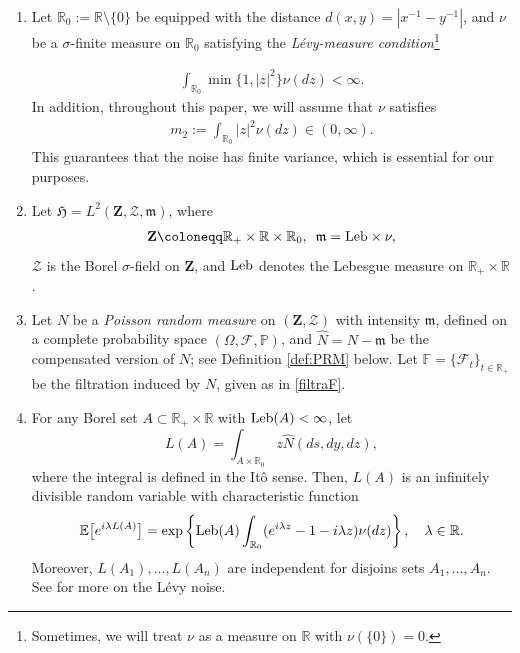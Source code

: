 \documentclass[letterpaper, 11pt,  reqno]{amsart}
\newcommand{\noi}{\noindent}
\newcommand{\R}{\mathbb{R}}
\newcommand{\bP}{\mathbb{P}}
\newcommand{\cF}{\mathcal{F}}
\newcommand{\E}{\mathbb{E}}
\newcommand{\F}{\mathcal{F}}
\newcommand{\s}{\sigma}
\newcommand{\PP}{\mathbb{P}}
\newcommand{\fm}{\mathfrak{m}}
\newcommand{\fH}{\mathfrak{H}}
\numberwithin{equation}{section}
\numberwithin{theorem}{section}
\begin{document}
\noi
\begin{enumerate}
\item[(a)] Let $\R_0 := \R\setminus\{0\}$ be equipped with
the distance $d(x,y)= |x^{-1} - y^{-1}|$, and  $\nu$ be a $\s$-finite measure on $\R_0$
 satisfying the {\it L\'evy-measure  condition}\footnote{Sometimes, we will treat $\nu$
as a measure on $\R$ with $\nu(\{0\})=0$.
} 



\noi  
\begin{align*} %
\int_{\R_0} \min\{1, |z|^2\} \nu(dz) <\infty.
\end{align*}
In addition, throughout this paper, we will assume that $\nu$ satisfies
\begin{align}
m_2:= \int_{\R_0}|z|^2\nu(dz) \in(0, \infty).
\label{m2}
\end{align}
This guarantees that the noise has finite variance, which is essential for our purposes.

\item[(b)] Let $\fH=L^2(\mathbf{Z},\mathcal{Z},\fm)$, where
\begin{align*} %
\mathbf{Z}\coloneqq \R_+\times\R\times\R_0,
\,\,\,
\fm = {\rm Leb}\times   \nu,
\end{align*} 
$\mathcal{Z}$ is the Borel $\s$-field on $\mathbf{Z}$,  
and $ {\rm Leb}$ denotes the Lebesgue measure on $\R_+\times\R$.


\item[(c)] Let $N$ be a {\em Poisson random measure} on $(\mathbf{Z}, \mathcal{Z})$ 
with intensity  $\fm$, defined on a complete probability space
 $(\Omega,\cF,\bP)$, and $\widehat{N} = N - \fm$ be the compensated version of $N$;
  see Definition \ref{def:PRM} below. Let $\mathbb{F}=\{ \F_t\}_{ t\in\R_+}$ be the filtration induced by $N$, given as in \eqref{filtraF}.
    
    
\item[(d)] For any Borel set $A\subset \R_+\times\R$ with ${\rm Leb}(A) <\infty$, let
\begin{equation}
\label{def-L}
L(A) = \int_{A\times \R_0} z \widehat{N}(ds, dy, dz),
\end{equation}
where the integral is defined in the It\^o sense. Then,
 $L(A)$ is an infinitely divisible random variable  with
characteristic function %
\[
\E\big[ e^{i\lambda L(A)}\big]
= \exp\left\{{\rm Leb}(A)\int_{\R_0}  (e^{i\lambda z}  - 1 - i\lambda z  ) \nu(dz) \right\},
 \quad \lambda \in\R.
\]
Moreover, $L(A_1),\ldots,L(A_n)$ are independent for disjoins sets $A_1,\ldots,A_n$.
See \cite{B15} for more on the L\'evy noise.

\end{enumerate}
\end{document}
